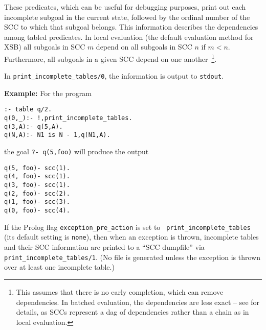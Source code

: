 \begin{description}
%
These predicates, which can be useful for debugging purposes, print
out each incomplete subgoal in the current state, followed by the
ordinal number of the SCC to which that subgoal belongs.  This
information describes the dependencies among tabled predicates.  In
local evaluation (the default evaluation method for XSB) all subgoals
in SCC $m$ depend on all subgoals in SCC $n$ if $m < n$.  Furthermore,
all subgoals in a given SCC depend on one another~\footnote{This
  assumes that there is no early completion, which can remove
  dependencies. In batched evaluation, the dependencies are less exact
  -- see \cite{SaSw98} for details, as SCCs represent a dag of
  dependencies rather than a chain as in local evaluation.}.

In {\tt print\_incomplete\_tables/0}, the information is output to
{\tt stdout}.

{\bf Example:} For the program
%
\begin{verbatim}
:- table q/2.
q(0,_):- !,print_incomplete_tables.
q(3,A):- q(5,A).
q(N,A):- N1 is N - 1,q(N1,A).
\end{verbatim}
the goal {\tt ?- q(5,foo)} will produce the output 
%
{\small
\begin{verbatim}
q(5, foo)- scc(1).
q(4, foo)- scc(1).
q(3, foo)- scc(1).
q(2, foo)- scc(2).
q(1, foo)- scc(3).
q(0, foo)- scc(4).
\end{verbatim}
}
%

%
If the Prolog flag {\tt exception\_pre\_action} is set to {\tt
  print\_incomplete\_tables} (its default setting is {\tt none}), then
when an exception is thrown, incomplete tables and their SCC
information are printed to a ``SCC dumpfile'' via {\tt
  print\_incomplete\_tables/1}.  (No file is generated unless
  the exception is thrown over at least one incomplete table.)


\end{description}
